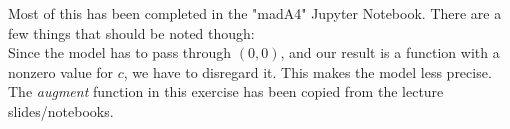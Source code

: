 Most of this has been completed in the "madA4" Jupyter Notebook. There are a few things that should be noted though:\\
Since the model has to pass through $(0,0)$, and our result is a function with a nonzero value for $c$, we have to disregard it. This makes the model less precise. The \textit{augment} function in this exercise has been copied from the lecture slides/notebooks.